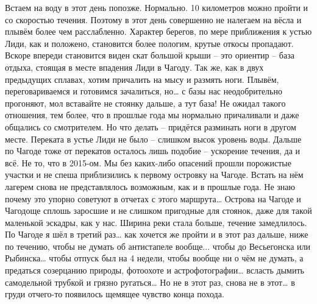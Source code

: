 Встаем на воду в этот день попозже. Нормально. 10 километров можно пройти и со скоростью течения. Поэтому в этот день совершенно не налегаем на вёсла и плывём более чем расслабленно.  Характер берегов, по мере приближения к устью Лиди, как и положено, становится более пологим, крутые откосы пропадают. Вскоре впереди становится виден скат большой крыши – это ориентир – база отдыха, стоящая в месте впадения Лиди в Чагоду. Так же, как в двух предыдущих сплавах, хотим причалить на мысу и размять ноги. Плывём, переговариваемся и готовимся зачалиться, но… с базы нас неодобрительно прогоняют, мол вставайте не стоянку дальше, а тут база! Не ожидал такого отношения, тем более, что в прошлые года мы нормально причаливали и даже общались со смотрителем. Но что делать – придётся разминать ноги в другом месте. 
Переката в устье Лиди не было – слишком высок уровень воды. Дальше по Чагоде тоже от перекатов осталось лишь подобие – ускорение течения, да и всё. Не то, что в 2015-ом. Мы без каких-либо опасений прошли порожистые участки и не спеша приблизились к первому островку на Чагоде. Встать на нём лагерем снова не представлялось возможным, как и в прошлые года. Не знаю почему это упорно советуют в отчетах с этого маршрута… Острова на Чагоде и Чагодоще сплошь заросшие и не слишком пригодные для стоянок, даже для такой маленькой эскадры, как у нас.
Ширина реки стала больше, течение замедлилось. По Чагоде я шёл в третий раз… как хочется же пройти и в этот раз дальше, ниже по течению, чтобы не думать об антистапеле вообще... чтобы до Весьегонска или Рыбинска… чтобы отпуск был на 4 недели, чтобы вообще ни о чём не думать, а предаться созерцанию природы, фотоохоте и астрофотографии… всласть дымить самодельной трубкой и грязно ругаться… Но не в этот раз, снова не в этот… в груди отчего-то появилось щемящее чувство конца похода.

\begin{center}
\end{center}
